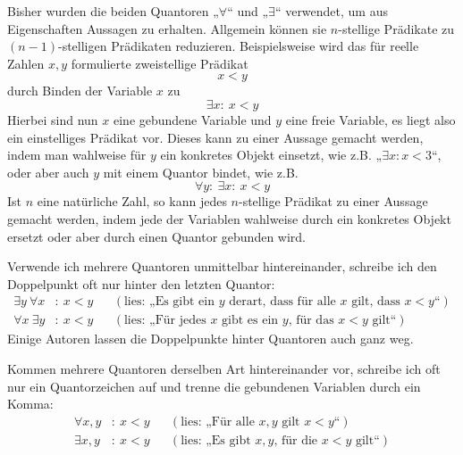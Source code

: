 \begin{bem}
    Bisher wurden die beiden Quantoren „$\forall$“ und „$\exists$“ verwendet, um aus Eigenschaften Aussagen zu erhalten. Allgemein können sie $n$-stellige Prädikate zu $(n-1)$-stelligen Prädikaten reduzieren. Beispielsweise wird das für reelle Zahlen $x,y$ formulierte zweistellige Prädikat
        \[ x < y \]
    durch Binden der Variable $x$ zu
        \[ \exists x:\ x<y \]
    Hierbei sind nun $x$ eine gebundene Variable und $y$ eine freie Variable, es liegt also ein einstelliges Prädikat vor. Dieses kann zu einer Aussage gemacht werden, indem man wahlweise für $y$ ein konkretes Objekt einsetzt, wie z.B. „$\exists x: x < 3$“, oder aber auch $y$ mit einem Quantor bindet, wie z.B.
        \[ \forall y:\ \exists x:\ x < y \]
    Ist $n$ eine natürliche Zahl, so kann jedes $n$-stellige Prädikat zu einer Aussage gemacht werden, indem jede der Variablen wahlweise durch ein konkretes Objekt ersetzt oder aber durch einen Quantor gebunden wird.
\end{bem}
 
 
\begin{nota}
    Verwende ich mehrere Quantoren unmittelbar hintereinander, schreibe ich den Doppelpunkt oft nur hinter den letzten Quantor:
    \begin{align*}
        \exists y\ \forall x& :\ x < y && (\text{lies: „Es gibt ein $y$ derart, dass für alle $x$ gilt, dass $x<y$“}) \\
        \forall x\ \exists y& :\ x < y && (\text{lies: „Für jedes $x$ gibt es ein $y$, für das $x<y$ gilt“})  
    \end{align*}
    Einige Autoren lassen die Doppelpunkte hinter Quantoren auch ganz weg.
    
    Kommen mehrere Quantoren derselben Art hintereinander vor, schreibe ich oft nur ein Quantorzeichen auf und trenne die gebundenen Variablen durch ein Komma:
    \begin{align*}
        \forall x,y&:\ x<y && (\text{lies: „Für alle $x,y$ gilt $x<y$“}) \\
        \exists x,y&:\ x<y && (\text{lies: „Es gibt $x,y$, für die $x<y$ gilt“}) 
    \end{align*}
\end{nota}

